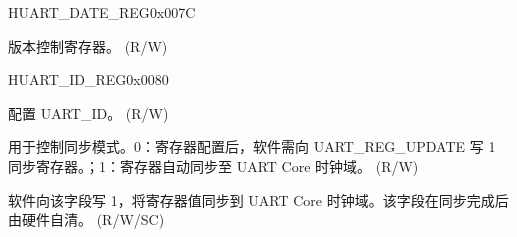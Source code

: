 \begin{register}{H}{UART\_DATE\_REG}{0x{}007C}\label{regdesc:UARTDATEREG}
%
\regnewline%
\begin{regdesc}\begin{reglist}
\label{fielddesc:UARTDATE}\item [UART\_DATE] 版本控制寄存器。 (R/W)
\end{reglist}\end{regdesc}
\end{register}


\begin{register}{H}{UART\_ID\_REG}{0x{}0080}\label{regdesc:UARTIDREG}
%
%
%
\regnewline%
\begin{regdesc}\begin{reglist}
\label{fielddesc:UARTID}\item [UART\_ID] 配置 UART\_ID。 (R/W)
\label{fielddesc:UARTUPDATECTRL}\item [UART\_UPDATE\_CTRL] 用于控制同步模式。0：寄存器配置后，软件需向 UART\_REG\_UPDATE 写 1 同步寄存器。；1：寄存器自动同步至 UART Core 时钟域。 (R/W)
\label{fielddesc:UARTREGUPDATE}\item [UART\_REG\_UPDATE] 软件向该字段写 1，将寄存器值同步到 UART Core 时钟域。该字段在同步完成后由硬件自清。 (R/W/SC)
\end{reglist}\end{regdesc}
\end{register}
